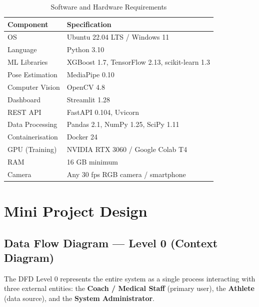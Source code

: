 \documentclass[12pt,a4paper]{report}
\begin{document}
\begin{table}[h!]
  \centering
  \caption{Software and Hardware Requirements}
  \label{tab:requirements}
  \vspace*{5pt}
  \begin{tabular}{|l|l|}
    \hline
    \textbf{Component} & \textbf{Specification} \\ \hline
    OS & Ubuntu 22.04 LTS / Windows 11 \\ \hline
    Language & Python 3.10 \\ \hline
    ML Libraries & XGBoost 1.7, TensorFlow 2.13, scikit-learn 1.3 \\ \hline
    Pose Estimation & MediaPipe 0.10 \\ \hline
    Computer Vision & OpenCV 4.8 \\ \hline
    Dashboard & Streamlit 1.28 \\ \hline
    REST API & FastAPI 0.104, Uvicorn \\ \hline
    Data Processing & Pandas 2.1, NumPy 1.25, SciPy 1.11 \\ \hline
    Containerisation & Docker 24 \\ \hline
    GPU (Training) & NVIDIA RTX 3060 / Google Colab T4 \\ \hline
    RAM & 16 GB minimum \\ \hline
    Camera & Any 30 fps RGB camera / smartphone \\ \hline
  \end{tabular}
\end{table}
\clearpage

\chapter{Mini Project Design}

\section{Data Flow Diagram — Level 0 (Context Diagram)}

The DFD Level 0 represents the entire system as a single process interacting with three external entities: the \textbf{Coach / Medical Staff} (primary user), the \textbf{Athlete} (data source), and the \textbf{System Administrator}.
\end{document}
